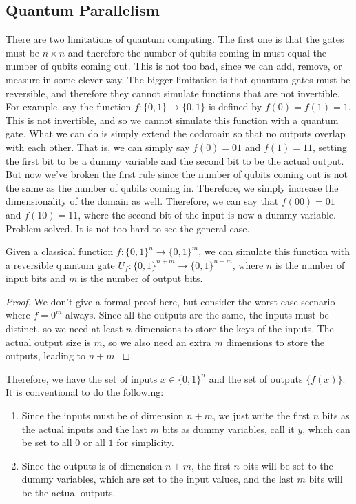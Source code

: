 \documentclass{article}
\newcounter{example}[section]
\begin{document}
  \subsection{Quantum Parallelism}

    There are two limitations of quantum computing. The first one is that the gates must be $n \times n$ and therefore the number of qubits coming in must equal the number of qubits coming out. This is not too bad, since we can add, remove, or measure in some clever way. The bigger limitation is that quantum gates must be reversible, and therefore they cannot simulate functions that are not invertible. For example, say the function $f: \{0, 1\} \to \{0, 1\}$ is defined by $f(0) = f(1) = 1$. This is not invertible, and so we cannot simulate this function with a quantum gate. What we can do is simply extend the codomain so that no outputs overlap with each other. That is, we can simply say $f(0) = 01$ and $f(1) = 11$, setting the first bit to be a dummy variable and the second bit to be the actual output. But now we've broken the first rule since the number of qubits coming out is not the same as the number of qubits coming in. Therefore, we simply increase the dimensionality of the domain as well. Therefore, we can say that $f(00) = 01$ and $f(10) = 11$, where the second bit of the input is now a dummy variable. Problem solved. It is not too hard to see the general case. 

    \begin{lemma}
      \label{thm:reversible-computing-of-a-classical-function}
      Given a classical function $f: \{0, 1\}^n \to \{0, 1\}^m$, we can simulate this function with a reversible quantum gate $U_f: \{0, 1\}^{n+m} \to \{0, 1\}^{n+m}$, where $n$ is the number of input bits and $m$ is the number of output bits.
    \end{lemma}
    \begin{proof} 
      We don't give a formal proof here, but consider the worst case scenario where $f = 0^m$ always. Since all the outputs are the same, the inputs must be distinct, so we need at least $n$ dimensions to store the keys of the inputs. The actual output size is $m$, so we also need an extra $m$ dimensions to store the outputs, leading to $n + m$. 
    \end{proof}

    Therefore, we have the set of inputs $x \in \{0, 1\}^n$ and the set of outputs $\{f(x)\}$. It is conventional to do the following: 
    \begin{enumerate} 
      \item Since the inputs must be of dimension $n+m$, we just write the first $n$ bits as the actual inputs and the last $m$ bits as dummy variables, call it $y$, which can be set to all $0$ or all $1$ for simplicity.  
      \item Since the outputs is of dimension $n+m$, the first $n$ bits will be set to the dummy variables, which are set to the input values, and the last $m$ bits will be the actual outputs. 
    \end{enumerate}
\end{document}

